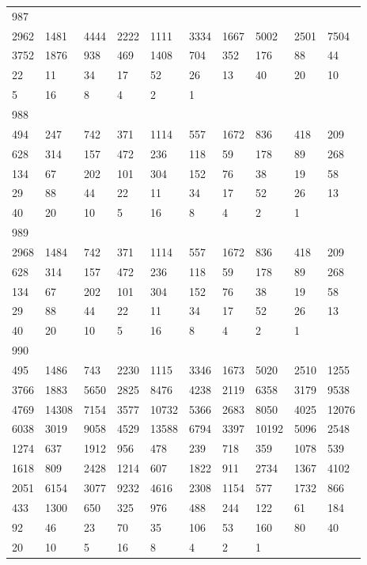 \begin{longtable}{*{10}{l}}
987&&&&&&&&&\\
2962& 1481& 4444& 2222& 1111& 3334& 1667& 5002& 2501& 7504\\
3752& 1876& 938& 469& 1408& 704& 352& 176& 88& 44\\
22& 11& 34& 17& 52& 26& 13& 40& 20& 10\\
5& 16& 8& 4& 2& 1& \\

988&&&&&&&&&\\
494& 247& 742& 371& 1114& 557& 1672& 836& 418& 209\\
628& 314& 157& 472& 236& 118& 59& 178& 89& 268\\
134& 67& 202& 101& 304& 152& 76& 38& 19& 58\\
29& 88& 44& 22& 11& 34& 17& 52& 26& 13\\
40& 20& 10& 5& 16& 8& 4& 2& 1& \\

989&&&&&&&&&\\
2968& 1484& 742& 371& 1114& 557& 1672& 836& 418& 209\\
628& 314& 157& 472& 236& 118& 59& 178& 89& 268\\
134& 67& 202& 101& 304& 152& 76& 38& 19& 58\\
29& 88& 44& 22& 11& 34& 17& 52& 26& 13\\
40& 20& 10& 5& 16& 8& 4& 2& 1& \\

990&&&&&&&&&\\
495& 1486& 743& 2230& 1115& 3346& 1673& 5020& 2510& 1255\\
3766& 1883& 5650& 2825& 8476& 4238& 2119& 6358& 3179& 9538\\
4769& 14308& 7154& 3577& 10732& 5366& 2683& 8050& 4025& 12076\\
6038& 3019& 9058& 4529& 13588& 6794& 3397& 10192& 5096& 2548\\
1274& 637& 1912& 956& 478& 239& 718& 359& 1078& 539\\
1618& 809& 2428& 1214& 607& 1822& 911& 2734& 1367& 4102\\
2051& 6154& 3077& 9232& 4616& 2308& 1154& 577& 1732& 866\\
433& 1300& 650& 325& 976& 488& 244& 122& 61& 184\\
92& 46& 23& 70& 35& 106& 53& 160& 80& 40\\
20& 10& 5& 16& 8& 4& 2& 1& \\


\end{longtable}
